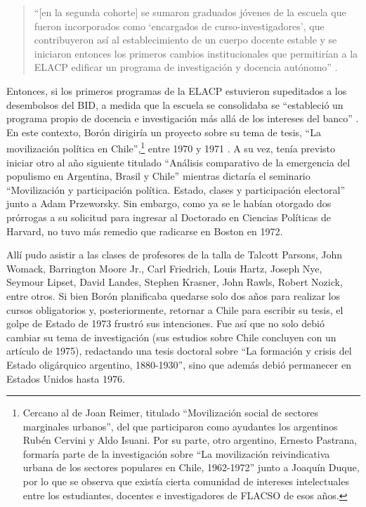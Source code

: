 {\begin{quote}
\enquote{[en la segunda cohorte] se sumaron graduados jóvenes de la escuela que fueron incorporados como \enquote{encargados de curso-investigadores}, que contribuyeron así al establecimiento de un cuerpo docente estable y se iniciaron entonces los primeros cambios institucionales que permitirían a la ELACP edificar un programa de investigación y docencia autónomo} \parencite[82]{1515-ABARZUACUTRONI2014}.
\end{quote}

Entonces, si los primeros programas de la ELACP estuvieron supeditados a los desembolsos del BID, a medida que la escuela se consolidaba se \enquote{estableció un programa propio de docencia e investigación más allá de los intereses del banco} \parencite[83]{1515-ABARZUACUTRONI2014}. En este contexto, Borón dirigiría un proyecto sobre su tema de tesis, \enquote{La movilización política en Chile},\footnote{Cercano al de Joan Reimer, titulado \enquote{Movilización social de sectores marginales urbanos}, del que participaron como ayudantes los argentinos Rubén Cervini y Aldo Isuani. Por su parte, otro argentino, Ernesto Pastrana, formaría parte de la investigación sobre \enquote{La movilización reivindicativa urbana de los sectores populares en Chile, 1962-1972} junto a Joaquín Duque, por lo que se observa que existía cierta comunidad de intereses intelectuales entre los estudiantes, docentes e investigadores de FLACSO de esos años.} entre 1970 y 1971 \parencites[166]{1690-ANONIMO1970}[134]{1691-ANONIMO1971}. A su vez, tenía previsto iniciar otro al año siguiente titulado \enquote{Análisis comparativo de la emergencia del populismo en Argentina, Brasil y Chile} \parencite[593]{1692-ANONIMO1971} mientras dictaría el seminario \enquote{Movilización y participación política. Estado, clases y participación electoral} junto a Adam Przeworsky. Sin embargo, como ya se le habían otorgado dos prórrogas a su solicitud para ingresar al Doctorado en Ciencias Políticas de Harvard, no tuvo más remedio que radicarse en Boston en 1972.

Allí pudo asistir a las clases de profesores de la talla de Talcott Parsons, John Womack, Barrington Moore Jr., Carl Friedrich, Louis Hartz, Joseph Nye, Seymour Lipset, David Landes, Stephen Krasner, John Rawls, Robert Nozick, entre otros. Si bien Borón planificaba quedarse solo dos años para realizar los cursos obligatorios y, posteriormente, retornar a Chile para escribir su tesis, el golpe de Estado de 1973 frustró sus intenciones. Fue así que no solo debió cambiar su tema de investigación (sus estudios sobre Chile concluyen con un artículo de 1975), redactando una tesis doctoral sobre \enquote{La formación y crisis del Estado oligárquico argentino, 1880-1930}, sino que además debió permanecer en Estados Unidos hasta 1976.

}
